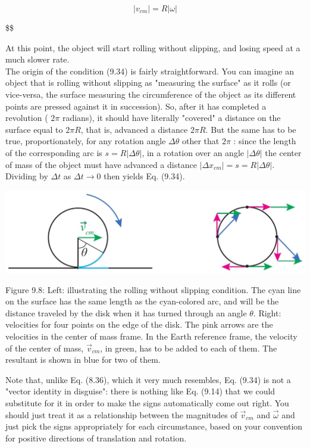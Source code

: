 \documentclass[10pt]{article}
\begin{document}
\begin{equation*}
\left|v_{c m}\right|=R|\omega| \tag{9.34}
\end{equation*}

\$\$

At this point, the object will start rolling without slipping, and losing speed at a much slower rate.\\
The origin of the condition (9.34) is fairly straightforward. You can imagine an object that is rolling without slipping as "measuring the surface" as it rolls (or vice-versa, the surface measuring the circumference of the object as its different points are pressed against it in succession). So, after it has completed a revolution ( $2 \pi$ radians), it should have literally "covered" a distance on the surface equal to $2 \pi R$, that is, advanced a distance $2 \pi R$. But the same has to be true, proportionately, for any rotation angle $\Delta \theta$ other that $2 \pi$ : since the length of the corresponding arc is $s=R|\Delta \theta|$, in a rotation over an angle $|\Delta \theta|$ the center of mass of the object must have advanced a distance $\left|\Delta x_{c m}\right|=s=R|\Delta \theta|$. Dividing by $\Delta t$ as $\Delta t \rightarrow 0$ then yields Eq. (9.34).

\begin{center}
\includegraphics[max width=\textwidth]{2024_09_14_9969b06773f10b6936e8g-226}
\end{center}

Figure 9.8: Left: illustrating the rolling without slipping condition. The cyan line on the surface has the same length as the cyan-colored arc, and will be the distance traveled by the disk when it has turned through an angle $\theta$. Right: velocities for four points on the edge of the disk. The pink arrows are the velocities in the center of mass frame. In the Earth reference frame, the velocity of the center of mass, $\vec{v}_{c m}$, in green, has to be added to each of them. The resultant is shown in blue for two of them.

Note that, unlike Eq. (8.36), which it very much resembles, Eq. (9.34) is not a "vector identity in disguise": there is nothing like Eq. (9.14) that we could substitute for it in order to make the signs automatically come out right. You should just treat it as a relationship between the magnitudes of $\vec{v}_{c m}$ and $\vec{\omega}$ and just pick the signs appropriately for each circumstance, based on your convention for positive directions of translation and rotation.
\end{document}
